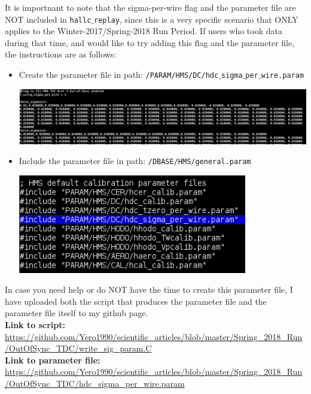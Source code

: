 \documentclass[11pt]{article}
\begin{document}
\newpage
\noindent It is importnant to note that the sigma-per-wire flag and the parameter file are NOT included in \texttt{hallc$\_$replay}, since this is a very specific scenario that
ONLY applies to the Winter-2017/Spring-2018 Run Period. If users who took data during that time, and would like to try adding this flag and the parameter file,
the instructions are as follows:
\begin{itemize}
\item  Create the parameter file in path: \texttt{/PARAM/HMS/DC/hdc$\_$sigma$\_$per$\_$wire.param} \par
  \begin{minipage}{\linewidth}
    \centering
    \includegraphics[width=15cm]{param.png}
    \label{fig:param}
  \end{minipage}
\item  Include the parameter file in path: \texttt{/DBASE/HMS/general.param} \par
  \begin{minipage}{\linewidth}                                                          
    \centering
    \includegraphics[width=10cm]{gen_parm.png}
    \label{fig:gen_param}
  \end{minipage}
\end{itemize}
\noindent In case you need help or do NOT have the time to create this parameter file, I have uploaded both the script that produces the parameter file and the parameter file
itself to my github page. \\
\textbf{Link to script:} \\ \url{https://github.com/Yero1990/scientific_articles/blob/master/Spring_2018_Run/OutOfSync_TDC/write_sig_param.C} \\
\textbf{Link to parameter file:} \\\url{https://github.com/Yero1990/scientific_articles/blob/master/Spring_2018_Run/OutOfSync_TDC/hdc_sigma_per_wire.param}

\newpage
\onecolumn


\end{document}
